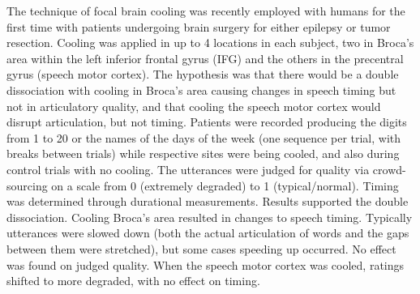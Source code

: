 \documentclass[output=paper,
modfonts
]{LSP/langsci}
\begin{document}
The technique of focal brain cooling was recently employed with humans for the first time \citep{Long2016} with patients undergoing brain surgery for either epilepsy or tumor resection. Cooling was applied in up to 4 locations in each subject, two in Broca's area within the left inferior frontal gyrus (IFG) and the others in the precentral gyrus (speech motor cortex). The hypothesis was that there would be a double dissociation with cooling in Broca's area causing changes in speech timing but not in articulatory quality, and that cooling the speech motor cortex would disrupt articulation, but not timing. Patients were recorded producing the digits from 1 to 20 or the names of the days of the week (one sequence per trial, with breaks between trials) while respective sites were being cooled, and also during control trials with no cooling. The utterances were judged for quality via crowd-sourcing on a scale from 0 (extremely degraded) to 1 (typical/normal). Timing was determined through durational measurements. Results supported the double dissociation. Cooling Broca's area resulted in changes to speech timing. Typically utterances  were slowed down (both the actual articulation of words and the gaps between them were stretched), but some cases speeding up occurred. No effect was found on judged quality. When the speech motor cortex was cooled, ratings shifted to more degraded, with no effect on timing.
\end{document}
